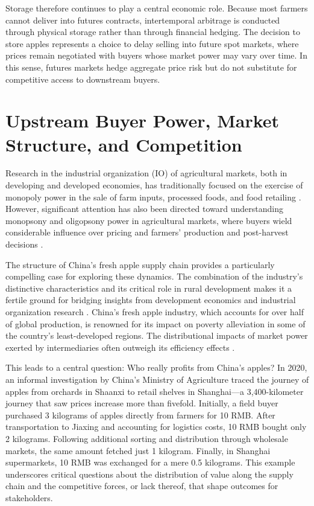Storage therefore continues to play a central economic role. Because most farmers cannot deliver into futures contracts, intertemporal arbitrage is conducted through physical storage rather than through financial hedging. The decision to store apples represents a choice to delay selling into future spot markets, where prices remain negotiated with buyers whose market power may vary over time. In this sense, futures markets hedge aggregate price risk but do not substitute for competitive access to downstream buyers.





\section{Upstream Buyer Power, Market Structure, and Competition \label{Section: market structure}}
\noindent 
Research in the industrial organization (IO) of agricultural markets, both in developing and developed economies, has traditionally focused on the exercise of monopoly power in the sale of farm inputs, processed foods, and food retailing \citep{macdonald2024introduction}. However, significant attention has also been directed toward understanding monopsony and oligopsony power in agricultural markets, where buyers wield considerable influence over pricing and farmers' production and post-harvest decisions \citep{kopp2021farmers, zavala2024unfair}.

The structure of China's fresh apple supply chain provides a particularly compelling case for exploring these dynamics. The combination of the industry's distinctive characteristics and its critical role in rural development makes it a fertile ground for bridging insights from development economics and industrial organization research \citep{bellemare2022agricultural}. China's fresh apple industry, which accounts for over half of global production, is renowned for its impact on poverty alleviation in some of the country's least-developed regions. The distributional impacts of market power exerted by intermediaries often outweigh its efficiency effects \citep{sexton2013market}.

This leads to a central question: Who really profits from China's apples? In 2020, an informal investigation by China's Ministry of Agriculture traced the journey of apples from orchards in Shaanxi to retail shelves in Shanghai---a 3,400-kilometer journey that saw prices increase more than fivefold. Initially, a field buyer purchased 3 kilograms of apples directly from farmers for 10 RMB. After transportation to Jiaxing and accounting for logistics costs, 10 RMB bought only 2 kilograms. Following additional sorting and distribution through wholesale markets, the same amount fetched just 1 kilogram. Finally, in Shanghai supermarkets, 10 RMB was exchanged for a mere 0.5 kilograms. This example underscores critical questions about the distribution of value along the supply chain and the competitive forces, or lack thereof, that shape outcomes for stakeholders.

